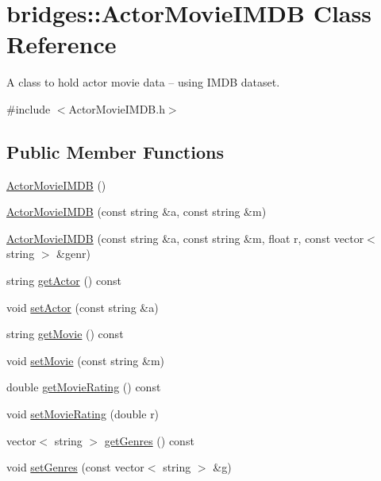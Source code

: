 \hypertarget{classbridges_1_1_actor_movie_i_m_d_b}{}\section{bridges\+:\+:Actor\+Movie\+I\+M\+DB Class Reference}
\label{classbridges_1_1_actor_movie_i_m_d_b}


A class to hold actor movie data -- using I\+M\+DB dataset.  




{\ttfamily \#include $<$Actor\+Movie\+I\+M\+D\+B.\+h$>$}

\subsection*{Public Member Functions}
\begin{DoxyCompactItemize}
\item 
\mbox{\hyperlink{classbridges_1_1_actor_movie_i_m_d_b_acd1db3914821a79a7d8fb506151d36a4}{Actor\+Movie\+I\+M\+DB}} ()
\item 
\mbox{\hyperlink{classbridges_1_1_actor_movie_i_m_d_b_a25dc6c2c2fd93d6add4e11500f81e981}{Actor\+Movie\+I\+M\+DB}} (const string \&a, const string \&m)
\item 
\mbox{\hyperlink{classbridges_1_1_actor_movie_i_m_d_b_a9c8f4acb9530b1a6adebb5ba1d163b4c}{Actor\+Movie\+I\+M\+DB}} (const string \&a, const string \&m, float r, const vector$<$ string $>$ \&genr)
\item 
string \mbox{\hyperlink{classbridges_1_1_actor_movie_i_m_d_b_a98145ede8d069fed5edce9c631ea6301}{get\+Actor}} () const
\item 
void \mbox{\hyperlink{classbridges_1_1_actor_movie_i_m_d_b_a9fa0b6d2a529c40640966aa078cf7ee2}{set\+Actor}} (const string \&a)
\item 
string \mbox{\hyperlink{classbridges_1_1_actor_movie_i_m_d_b_ab0c6e7d290dfe9d847cf3193323c158d}{get\+Movie}} () const
\item 
void \mbox{\hyperlink{classbridges_1_1_actor_movie_i_m_d_b_ae773ef3fc7ae370d4ab2bc1aeac60a9a}{set\+Movie}} (const string \&m)
\item 
double \mbox{\hyperlink{classbridges_1_1_actor_movie_i_m_d_b_a8ab7caed7d36c1d371ff9f645db9bfe0}{get\+Movie\+Rating}} () const
\item 
void \mbox{\hyperlink{classbridges_1_1_actor_movie_i_m_d_b_aea16db5315526ff31a1685c08390cdc7}{set\+Movie\+Rating}} (double r)
\item 
vector$<$ string $>$ \mbox{\hyperlink{classbridges_1_1_actor_movie_i_m_d_b_a743646c44f7386901accdb12cbce88c2}{get\+Genres}} () const
\item 
void \mbox{\hyperlink{classbridges_1_1_actor_movie_i_m_d_b_acae015a46ec88155ca159974f29ba234}{set\+Genres}} (const vector$<$ string $>$ \&g)
\end{DoxyCompactItemize}


